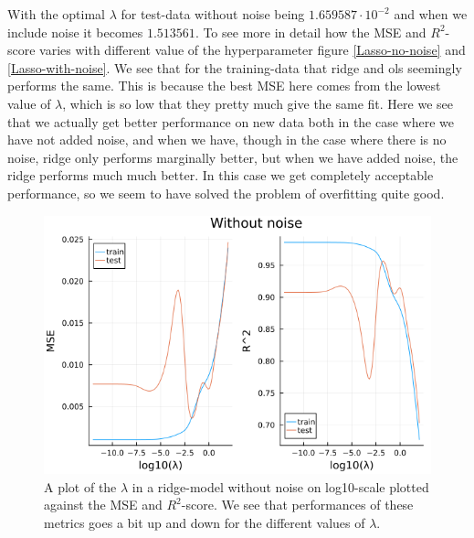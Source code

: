 \documentclass{article}
\begin{document}
With the optimal $\lambda$ for test-data without noise being $1.659587\cdot
    10^{-2}$ and when we include noise it becomes $1.513561$.
To see more in detail how the MSE and $R^2$-score varies with different value of
the hyperparameter figure \ref{Lasso-no-noise} and \ref{Lasso-with-noise}. We
see that for the training-data that ridge and ols seemingly performs the same.
This is because the best MSE here comes from the lowest value of $\lambda$,
which is so low that they pretty much give the same fit. Here we see that we
actually get better performance on new data both in the case where we have not
added noise, and when we have, though in the case where there is no noise, ridge
only performs marginally better, but when we have added noise, the ridge
performs much much better. In this case we get completely acceptable
performance, so we seem to have solved the problem of overfitting quite good.
\begin{figure}
    \centerline{\includegraphics[scale=0.5]{ridge_without_noise}}
    \caption{A plot of the $\lambda$ in a ridge-model without noise on log10-scale plotted against the MSE and $R^2$-score. We see that performances of these metrics goes a bit up and down for the different values of $\lambda$.}
    \label{Ridge-with-noise}
\end{figure}
\end{document}
